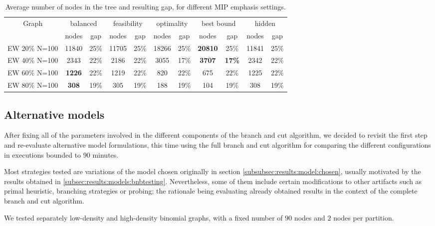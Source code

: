 \begin{table}[h]
\centering

\begin{tabular}{|c|cc|cc|cc|cc|cc|}
\hline
\multicolumn{1}{|c|}{Graph} & \multicolumn{2}{|c|}{balanced} & \multicolumn{2}{|c|}{feasibility} & \multicolumn{2}{|c|}{optimality} & \multicolumn{2}{|c|}{best bound} & \multicolumn{2}{|c|}{hidden}
\\
 & nodes & gap & nodes & gap & nodes & gap & nodes & gap & nodes & gap
\\
\hline
EW 20\% N=100 & 11840 &25\% & 11705 &25\% & 18266 &25\% & \textbf{20810} &25\% & 11841 &25\%
\\
EW 40\% N=100 & 2343 &22\% & 2186 &22\% & 3055 &17\% & \textbf{3707} & \textbf{17\%} & 2342 &22\%
\\
EW 60\% N=100 & \textbf{1226} &22\% & 1219 &22\% & 820 &22\% & 675 &22\% & 1225 &22\%
\\
EW 80\% N=100 & \textbf{308} &19\% & 305 &19\% & 188 &19\% & 104 &19\% & 308 &19\%
\\
\hline 
\end{tabular}

\caption{Average number of nodes in the tree and resulting gap, for different MIP emphasis settings.}
\label{table:bnc:emph}

\end{table}

\clearpage

\subsection{Alternative models}

After fixing all of the parameters involved in the different components of the branch and cut algorithm, we decided to revisit the first step and re-evaluate alternative model formulations, this time using the full branch and cut algorithm for comparing the different configurations in executions bounded to $90$ minutes.

Most strategies tested are variations of the model chosen originally in section \ref{subsubsec:results:model:chosen}, usually motivated by the results obtained in \ref{subsec:results:models:bnbtesting}. Nevertheless, some of them include certain modifications to other artifacts such as primal heuristic, branching strategies or probing; the rationale being evaluating already obtained results in the context of the complete branch and cut algorithm.

We tested separately low-density and high-density binomial graphs, with a fixed number of $90$ nodes and $2$ nodes per partition. 

